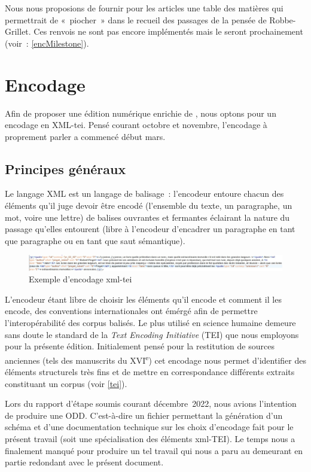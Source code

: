 \documentclass[12pt, a4paper]{article}
\begin{document}
Nous nous proposions de fournir pour les articles une table des matières qui permettrait de «~piocher~» dans le recueil des passages de la pensée de Robbe-Grillet. Ces renvois ne sont pas encore implémentés mais le seront prochainement (voir~: \ref{encMilestone}).


\section{Encodage}
Afin de proposer une édition numérique enrichie de \punr, nous optons pour un encodage en XML-tei. Pensé courant octobre et novembre, l'encodage à proprement parler a commencé début mars.
    \subsection{Principes généraux}
Le langage XML est un langage de balisage~: l'encodeur entoure chacun des éléments qu'il juge devoir être encodé (l'ensemble du texte, un paragraphe, un mot, voire une lettre) de balises ouvrantes et fermantes éclairant la nature du passage qu'elles entourent (libre à l'encodeur d'encadrer un paragraphe en tant que paragraphe ou en tant que saut sémantique).

\begin{figure}[H]
    \centering
    \includegraphics[scale=0.5]{img/screen_encodage.jpg}
    \caption{Exemple d'encodage xml-tei}
    \label{fig:screen_encodage}
\end{figure}

L'encodeur étant libre de choisir les éléments qu'il encode et comment il les encode, des conventions internationales ont émérgé afin de permettre l'interopérabilité des corpus balisés. Le plus utilisé en science humaine demeure sans doute le standard de la \textit{Text Encoding Initiative} (TEI) que nous employons pour la présente édition. Initialement pensé pour la restitution de sources anciennes (tels des manuscrits du \textsc{XVI}\textsuperscript{e}) cet encodage nous permet d'identifier des éléments structurels très fins et de mettre en correspondance différents extraits constituant un corpus (voir \ref{tei}).

Lors du rapport d'étape soumis courant décembre~2022, nous avions l'intention de produire une ODD. C'est-à-dire un fichier permettant la génération d'un schéma et d'une documentation technique sur les choix d'encodage fait pour le présent travail (soit une spécialisation des éléments xml-TEI). Le temps nous a finalement manqué pour produire un tel travail qui nous a paru au demeurant en partie redondant avec le présent document.
\end{document}
